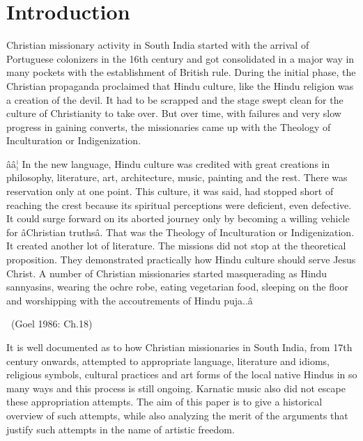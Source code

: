 \vspace{-.3cm}

\section*{Introduction}

Christian missionary activity in South India started with the arrival of Portuguese colonizers in the 16th century and got consolidated in a major way in many pockets with the establishment of British rule. During the initial phase, the Christian propaganda proclaimed that Hindu culture, like the Hindu religion was a creation of the devil. It had to be scrapped and the stage swept clean for the culture of Christianity to take over. But over time, with failures and very slow progress in gaining converts, the missionaries came up with the Theology of Inculturation or Indigenization.

\begin{myquote}
ââ¦ In the new language, Hindu culture was credited with great creations in philosophy, literature, art, architecture, music, painting and the rest. There was reservation only at one point. This culture, it was said, had stopped short of reaching the crest because its spiritual perceptions were deficient, even defective. It could surge forward on its aborted journey only by becoming a willing vehicle for âChristian truthsâ. That was the Theology of Inculturation or Indigenization. It created another lot of literature. The missions did not stop at the theoretical proposition. They demonstrated practically how Hindu culture should serve Jesus Christ. A number of Christian missionaries started masquerading as Hindu sannyasins, wearing the ochre robe, eating vegetarian food, sleeping on the floor and worshipping with the accoutrements of Hindu puja..â 

~\hfill (Goel 1986: Ch.18)
\end{myquote}

It is well documented as to how Christian missionaries in South India, from 17th century onwards, attempted to appropriate language, literature and idioms, religious symbols, cultural practices and art forms of the local native Hindus in so many ways and this process is still ongoing. Karnatic music also did not escape these appropriation attempts. The aim of this paper is to give a historical overview of such attempts, while also analyzing the merit of the arguments that justify such attempts in the name of artistic freedom.

